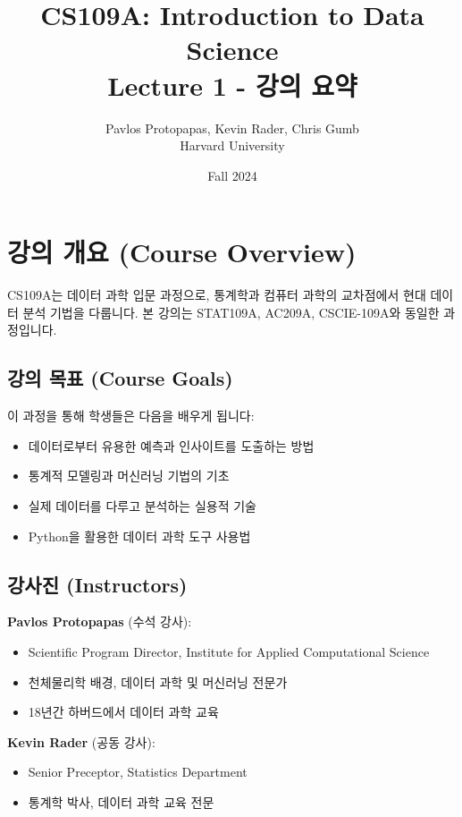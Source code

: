 \documentclass[12pt,a4paper]{article}
\title{\textbf{CS109A: Introduction to Data Science} \\ Lecture 1 - 강의 요약}
\author{Pavlos Protopapas, Kevin Rader, Chris Gumb \\ Harvard University}
\date{Fall 2024}
\begin{document}
\maketitle

\tableofcontents
\newpage

\section{강의 개요 (Course Overview)}

CS109A는 데이터 과학 입문 과정으로, 통계학과 컴퓨터 과학의 교차점에서 현대 데이터 분석 기법을 다룹니다. 본 강의는 STAT109A, AC209A, CSCIE-109A와 동일한 과정입니다.

\subsection{강의 목표 (Course Goals)}

이 과정을 통해 학생들은 다음을 배우게 됩니다:
\begin{itemize}
    \item 데이터로부터 유용한 예측과 인사이트를 도출하는 방법
    \item 통계적 모델링과 머신러닝 기법의 기초
    \item 실제 데이터를 다루고 분석하는 실용적 기술
    \item Python을 활용한 데이터 과학 도구 사용법
\end{itemize}

\subsection{강사진 (Instructors)}

\textbf{Pavlos Protopapas} (수석 강사):
\begin{itemize}
    \item Scientific Program Director, Institute for Applied Computational Science
    \item 천체물리학 배경, 데이터 과학 및 머신러닝 전문가
    \item 18년간 하버드에서 데이터 과학 교육
\end{itemize}

\textbf{Kevin Rader} (공동 강사):
\begin{itemize}
    \item Senior Preceptor, Statistics Department
    \item 통계학 박사, 데이터 과학 교육 전문
\end{itemize}
\end{document}
